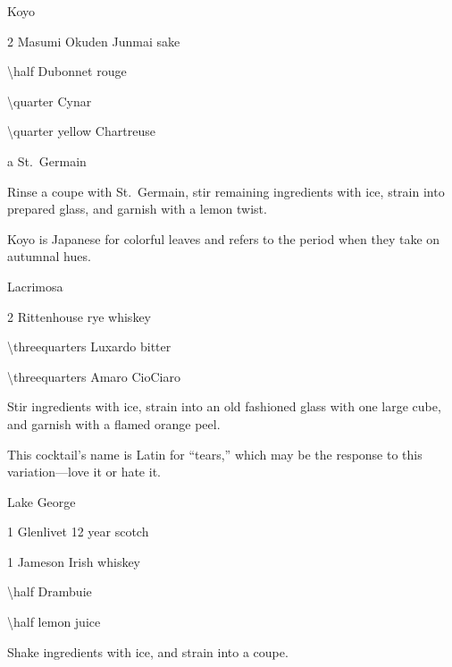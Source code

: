 \begin{Cocktail}[\PDT]{Koyo}
  \begin{Ingredients}
  \item \SI{2}{\oz} Masumi Okuden Junmai sake
  \item \SI{\half}{\oz} Dubonnet rouge
  \item \SI{\quarter}{\oz} Cynar
  \item \SI{\quarter}{\oz} yellow Chartreuse
  \item a \si{\dash} St.\ Germain
  \end{Ingredients}
  
  \begin{Instructions}
	Rinse a coupe with St.\ Germain, stir remaining ingredients with ice, strain into prepared glass, and garnish with a lemon twist.
	
	Koyo is Japanese for colorful leaves and refers to the period when they take on autumnal hues.
  \end{Instructions}
\end{Cocktail}

\begin{Cocktail}[\PDT]{Lacrimosa}
  \begin{Ingredients}
  \item \SI{2}{\oz} Rittenhouse rye whiskey
  \item \SI{\threequarters}{\oz} Luxardo bitter
  \item \SI{\threequarters}{\oz} Amaro CioCiaro
  \end{Ingredients}
  
  \begin{Instructions}
	Stir ingredients with ice, strain into an old fashioned glass with one large cube, and garnish with a flamed orange peel.
	
	This cocktail's name is Latin for ``tears,'' which may be the response to this  variation---love it or hate it.
  \end{Instructions}
\end{Cocktail}

\begin{Cocktail}[\PDT]{Lake George}
  \begin{Ingredients}
  \item \SI{1}{\oz} Glenlivet 12 year scotch
  \item \SI{1}{\oz} Jameson Irish whiskey
  \item \SI{\half}{\oz} Drambuie
  \item \SI{\half}{\oz} lemon juice
  \end{Ingredients}
  
  \begin{Instructions}
	Shake ingredients with ice, and strain into a coupe.
  \end{Instructions}
\end{Cocktail}

